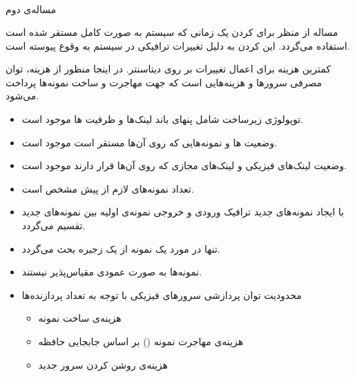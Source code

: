 \documentclass{beamer}
\makeatletter
\newcommand{\RTList}{\raggedleft\rightskip\@totalleftmargin}
\makeatother
\begin{document}
\begin{persian}
\begin{frame}
\begin{latin}
\begin{align}
	\end{align}\end{latin}
\end{frame}
\begin{frame}{مساله‌ی دوم}
	\par
	مساله از منظر  برای  کردن یک 
	زمانی که سیستم به صورت کامل مستقر شده است استفاده می‌گردد.
	این  کردن به دلیل تغییرات ترافیکی در سیستم به وقوع پیوسته است.
\end{frame}
\begin{frame}
	\par
	کمترین هزینه برای اعمال تغییرات بر روی دیتاسنتر.
	در اینجا منظور از هزینه، توان مصرفی سرورها و هزینه‌هایی است که جهت مهاجرت و ساخت نمونه‌ها پرداخت می‌شود.
\end{frame}
\begin{frame}
	\begin{itemize}\RTList
		\item توپولوژی زیرساخت شامل پنهای باند لینک‌ها و ظرفیت ها موجود است.
		\item وضعیت ها و نمونه‌هایی که روی آن‌ها مستقر است موجود است.
		\item وضعیت لینک‌های فیزیکی و لینک‌های مجازی که روی آن‌ها قرار دارند موجود است.
		\item تعداد نمونه‌های لازم از پیش مشخص است.
		\item با ایجاد نمونه‌های جدید ترافیک ورودی و خروجی نمونه‌ی اولیه بین نمونه‌های جدید تقسیم می‌گردد.
		\item تنها در مورد یک نمونه از یک زجیره بحث می‌گردد.
	\end{itemize}
\end{frame}
\begin{frame}
	\begin{itemize}\RTList
		\item نمونه‌ها به صورت عمودی مقیاس‌پذیر نیستند.
		\item محدودیت توان پردازشی سرورهای فیزیکی با توجه به تعداد پردازنده‌ها
		\begin{itemize}\RTList
			\item هزینه‌ی ساخت نمونه
			\item هزینه‌ی مهاجرت نمونه () بر اساس جابجایی حافظه
			\item هزینه‌ی روشن کردن سرور جدید
		\end{itemize}
	\end{itemize}
\end{frame}
\begin{frame}

\end{frame}
\end{persian}
\end{document}

